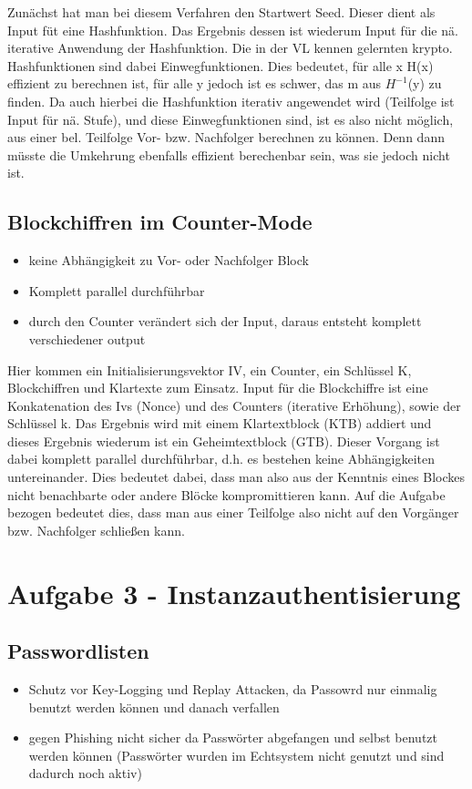 \documentclass{scrartcl}
\begin{document}
Zunächst hat man bei diesem Verfahren den Startwert Seed. Dieser dient als Input füt eine Hashfunktion. Das Ergebnis
dessen ist wiederum Input für die nä. iterative Anwendung der Hashfunktion. Die in der VL kennen gelernten krypto.
Hashfunktionen sind dabei Einwegfunktionen. Dies bedeutet, für alle x H(x) effizient zu berechnen ist, für alle y
jedoch ist es schwer, das m aus $H^{-1}$(y) zu finden. Da auch hierbei die Hashfunktion iterativ angewendet wird
(Teilfolge ist Input für nä. Stufe), und diese Einwegfunktionen sind, ist es also nicht möglich, aus einer bel.
Teilfolge Vor- bzw. Nachfolger berechnen zu können. Denn dann müsste die Umkehrung ebenfalls effizient berechenbar
sein, was sie jedoch nicht ist.

\subsection*{Blockchiffren im Counter-Mode}
\begin{itemize}
  \item keine Abhängigkeit zu Vor- oder Nachfolger Block
  \item Komplett parallel durchführbar
  \item durch den Counter verändert sich der Input, daraus entsteht komplett
    verschiedener output
\end{itemize}

Hier kommen ein Initialisierungsvektor IV, ein Counter, ein Schlüssel K, Blockchiffren und Klartexte zum Einsatz.
Input für die Blockchiffre ist eine Konkatenation des Ivs (Nonce) und des Counters (iterative Erhöhung), sowie der
Schlüssel k. Das Ergebnis wird mit einem Klartextblock (KTB) addiert und dieses Ergebnis wiederum ist ein 
Geheimtextblock (GTB). Dieser Vorgang ist dabei komplett parallel durchführbar, d.h. es bestehen keine 
Abhängigkeiten untereinander. Dies bedeutet dabei, dass man also aus der Kenntnis eines Blockes nicht 
benachbarte oder andere Blöcke kompromittieren kann. Auf die Aufgabe bezogen bedeutet dies, dass man 
aus einer Teilfolge also nicht auf den Vorgänger bzw. Nachfolger schließen kann.

\section*{Aufgabe 3 - Instanzauthentisierung}
\subsection*{Passwordlisten}
\begin{itemize}
  \item Schutz vor Key-Logging und Replay Attacken, da Passowrd nur einmalig
    benutzt werden können und danach verfallen
  \item gegen Phishing nicht sicher da Passwörter abgefangen und selbst
    benutzt werden können (Passwörter wurden im Echtsystem nicht genutzt und
    sind dadurch noch aktiv)
\end{itemize}
\end{document}
